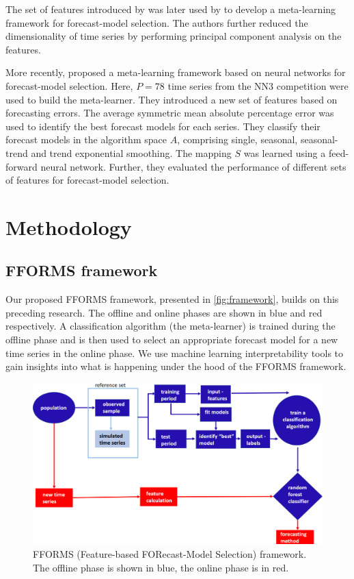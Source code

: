 \documentclass[11pt,a4paper,]{article}
\begin{document}
The set of features introduced by \textcite{wang2009rule} was later used by \textcite{widodomodel} to develop a meta-learning framework for forecast-model selection. The authors further reduced the dimensionality of time series by performing principal component analysis on the features.

More recently, \textcite{kuck2016meta} proposed a meta-learning framework based on neural networks for forecast-model selection. Here, \(P = 78\) time series from the NN3 competition were used to build the meta-learner. They introduced a new set of features based on forecasting errors. The average symmetric mean absolute percentage error was used to identify the best forecast models for each series. They classify their forecast models in the algorithm space \(A\), comprising single, seasonal, seasonal-trend and trend exponential smoothing. The mapping \(S\) was learned using a feed-forward neural network. Further, they evaluated the performance of different sets of features for forecast-model selection.

\hypertarget{fforms}{%
\section{Methodology}\label{fforms}}

\hypertarget{fforms-framework}{%
\subsection{FFORMS framework}\label{fforms-framework}}

Our proposed FFORMS framework, presented in \autoref{fig:framework}, builds on this preceding research. The offline and online phases are shown in blue and red respectively. A classification algorithm (the meta-learner) is trained during the offline phase and is then used to select an appropriate forecast model for a new time series in the online phase. We use machine learning interpretability tools to gain insights into what is happening under the hood of the FFORMS framework.

\begin{figure}

{\centering \includegraphics[width=1\linewidth]{images/framework} 

}

\caption{FFORMS (Feature-based FORecast-Model Selection) framework. The offline phase is shown in blue, the online phase is in red.}\label{fig:framework}
\end{figure}
\end{document}
